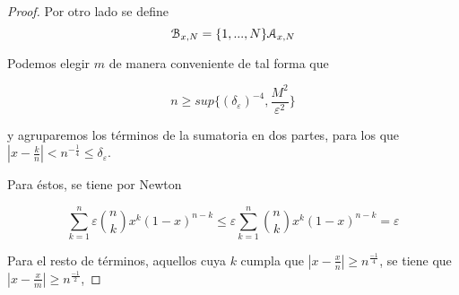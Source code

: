 \begin{proof}
    Por otro lado se define
    $$\mathcal{B}_{x,N} = \{1, ..., N\} \\ \mathcal{A}_{x,N}$$


    Podemos elegir $m$ de manera conveniente de tal forma que 

    $$ n \geq sup \{ (\delta_\varepsilon) ^{-4}, \frac{M^2}{\varepsilon^2}\}$$


    y agruparemos los términos de la sumatoria en dos partes, para los que 
    $|x - \frac{k}{n}| < n^{ -\frac{1}{4}} \leq \delta_\varepsilon$. 

    Para éstos,  se tiene por Newton  

    \begin{equation*}
        \sum_{k=1}^n   \varepsilon \binom{n}{k} x^k (1-x)^{n-k} \leq \varepsilon \sum_{k=1}^n \binom{n}{k} x^k (1-x)^{n-k} =  \varepsilon
    \end{equation*}

    Para el resto de términos, aquellos cuya $k$ cumpla que $|x - \frac{x}{n}| \geq n ^\frac{-1}{4}$, se tiene que 
    $|x - \frac{x}{m}| \geq n ^\frac{-1}{2}$,

\end{proof}

 
 
\endinput 